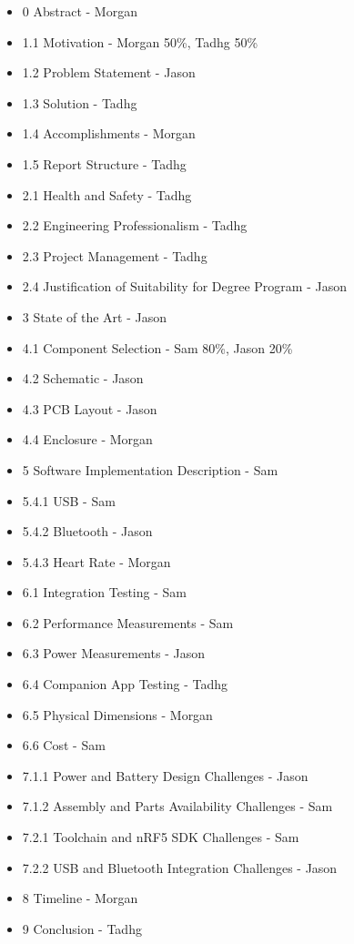 \begin{itemize}
    \item 0 Abstract - Morgan
    \item 1.1 Motivation - Morgan 50\%, Tadhg 50\%
    \item 1.2 Problem Statement - Jason
    \item 1.3 Solution - Tadhg
    \item 1.4 Accomplishments - Morgan
    \item 1.5 Report Structure - Tadhg
    \item 2.1 Health and Safety - Tadhg
    \item 2.2 Engineering Professionalism - Tadhg
    \item 2.3 Project Management - Tadhg
    \item 2.4 Justification of Suitability for Degree Program - Jason
    \item 3 State of the Art - Jason
    \item 4.1 Component Selection - Sam 80\%, Jason 20\%
    \item 4.2 Schematic - Jason
    \item 4.3 PCB Layout - Jason
    \item 4.4 Enclosure - Morgan
    \item 5 Software Implementation Description - Sam
    \item 5.4.1 USB - Sam
    \item 5.4.2 Bluetooth - Jason
    \item 5.4.3 Heart Rate - Morgan
    \item 6.1 Integration Testing - Sam
    \item 6.2 Performance Measurements - Sam
    \item 6.3 Power Measurements - Jason
    \item 6.4 Companion App Testing - Tadhg
    \item 6.5 Physical Dimensions - Morgan
    \item 6.6 Cost - Sam
    \item 7.1.1 Power and Battery Design Challenges - Jason
    \item 7.1.2 Assembly and Parts Availability Challenges - Sam
    \item 7.2.1 Toolchain and nRF5 SDK Challenges - Sam
    \item 7.2.2 USB and Bluetooth Integration Challenges - Jason
    \item 8 Timeline - Morgan
    \item 9 Conclusion - Tadhg
\end{itemize}
